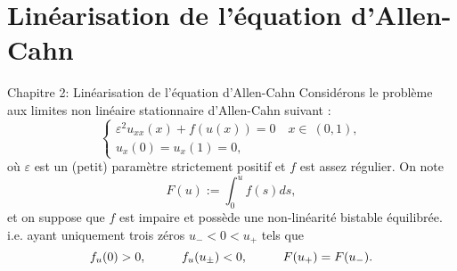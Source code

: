 \documentclass[mathserif,10pt]{beamer}
\begin{document}
\section{Linéarisation de l'équation d'Allen-Cahn }
\begin{frame}{Chapitre 2: Linéarisation de l'équation d'Allen-Cahn  }\transglitter[duration=1]
Considérons le problème aux limites non linéaire stationnaire d'Allen-Cahn  suivant :
\begin{equation}\label{cha3.1}
\begin{cases}
\varepsilon^{2}u_{xx}(x)+f(u(x))=0 \quad x \in  \ (0,1), \\[12pt]
u_{x}(0)=u_{x}(1)=0, 
\end{cases}
\end{equation}
où $\varepsilon $ est un (petit) paramètre strictement positif et $f$ est assez régulier. \pause 
On note 
$$
F(u):= \int_{0}^{u}f(s)ds,
 $$
et on suppose que $f$ est impaire et possède une non-linéarité bistable équilibrée. \pause
i.e. ayant uniquement trois zéros $u_{-} < 0 <u_{+}$ tels que 
 \begin{equation}\label{cha3.3}
 f_{u}(0)> 0, \hspace*{1cm} f_{u}(u_{\pm})< 0, \hspace*{1cm}  F(u_{+})=F(u_{-}).
\end{equation}
\end{frame}
\end{document}
